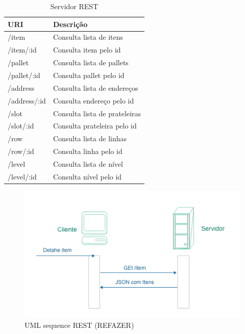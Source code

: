 \begin{table}[htbp]
    \centering
    \begin{tabular}{| l | l |}
        \hline
        \textbf{URI} & \textbf{Descrição} \\ \hline
        /item & Consulta lista de itens \\ \hline
        /item/:id & Consulta item pelo id \\ \hline
        /pallet & Consulta lista de pallets  \\ \hline
        /pallet/:id & Consulta pallet pelo id  \\ \hline
        /address & Consulta lista de endereços \\ \hline
        /address/:id & Consulta endereço pelo id \\ \hline
        /slot & Consulta lista de prateleiras \\ \hline
        /slot/:id & Consulta prateleira pelo id \\ \hline
        /row & Consulta lista de linhas \\ \hline
        /row/:id & Consulta linha pelo id \\ \hline
        /level & Consulta lista de nível \\ \hline
        /level/:id & Consulta nível pelo id \\ \hline
    \end{tabular}
    \caption{Servidor REST} \label{tab:rest-url}
\end{table}

\begin{figure}[htbp]
\centering
\includegraphics[width=1\textwidth]{figuras/uml-rest.png}
\caption{UML sequence REST (REFAZER)}
\label{fig:rest-uml}
\author{fonte: Autor}
\end{figure}

